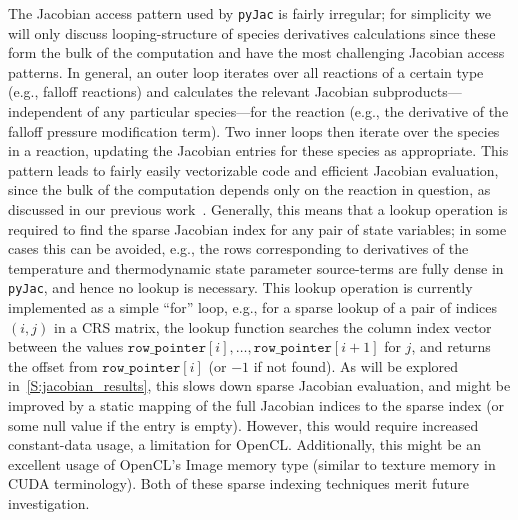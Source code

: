 \documentclass[12pt,number,sort&compress,preprint]{elsarticle}
\newcommand{\revise}[1]{{\sloppy\textcolor{RoyalPurple}{#1}}}  %
\begin{document}
The Jacobian access pattern used by \texttt{pyJac} is fairly irregular; for simplicity we will only discuss looping-structure of species derivatives calculations since these form the bulk of the computation and have the most challenging Jacobian access patterns.
In general, an outer loop iterates over all reactions of a certain type (e.g., falloff reactions) and calculates the relevant Jacobian subproducts---independent of any particular species---for the reaction (e.g., the derivative of the falloff pressure modification term).
Two inner loops then iterate over the species in a reaction, updating the Jacobian entries for these species as appropriate.
This pattern leads to fairly easily vectorizable code and efficient Jacobian evaluation, since the bulk of the computation depends only on the reaction in question, as discussed in our previous work~\cite{Niemeyer:2016aa}.
Generally, this means that a lookup operation is required to find the sparse Jacobian index for any pair of state variables; in some cases this can be avoided, e.g., the rows corresponding to derivatives of the temperature and thermodynamic state parameter source-terms are fully dense in \texttt{pyJac}, and hence no lookup is necessary.
This lookup operation is currently implemented as a simple ``for'' loop, e.g., for a sparse lookup of a pair of indices $(i, j)$ in a CRS matrix, the lookup function searches the column index vector between the values $\texttt{row\_pointer}[i], \ldots, \texttt{row\_pointer}[i + 1]$ for $j$, and returns the offset from $\texttt{row\_pointer}[i]$ (or $\num{-1}$ if not found).
As will be explored in~\cref{S:jacobian_results}, this slows down sparse Jacobian evaluation, and might be improved by a static mapping of the full Jacobian indices to the sparse index (or some null value if the entry is empty).
\revise{However, this would require increased constant-data usage, a limitation for OpenCL.}
Additionally, this might be an excellent usage of OpenCL's Image memory type (similar to texture memory in CUDA terminology).
Both of these sparse indexing techniques merit future investigation.
\end{document}
